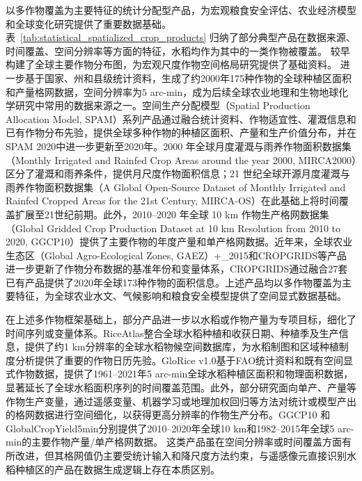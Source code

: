 以多作物覆盖为主要特征的统计分配型产品，为宏观粮食安全评估、农业经济模型和全球变化研究提供了重要数据基础。表~\ref{tab:statistical_spatialized_crop_products} 归纳了部分典型产品在数据来源、时间覆盖、空间分辨率等方面的特征，水稻均作为其中的一类作物被覆盖。\citet{Leff2004} 较早构建了全球主要作物分布图，为宏观尺度作物空间格局研究提供了基础资料。\citet{Monfreda2008CropDistribution} 进一步基于国家、州和县级统计资料，生成了约2000年175种作物的全球种植区面积和产量格网数据，空间分辨率为5 arc-min，成为后续全球农业地理和生物地球化学研究中常用的数据来源之一。空间生产分配模型（Spatial Production Allocation Model, SPAM）系列产品通过融合统计资料、作物适宜性、灌溉信息和已有作物分布先验，提供全球多种作物的种植区面积、产量和生产价值分布，并在SPAM 2020中进一步更新至2020年\cite{You2014SPAM,Yu2020SPAM,IFPRI2026SPAM2020}。2000 年全球月度灌溉与雨养作物面积数据集（Monthly Irrigated and Rainfed Crop Areas around the year 2000, MIRCA2000）区分了灌溉和雨养条件，提供月尺度作物面积信息\cite{Portmann2010MIRCA}；21 世纪全球开源月度灌溉与雨养作物面积数据集（A Global Open-Source Dataset of Monthly Irrigated and Rainfed Cropped Areas for the 21st Century, MIRCA-OS）在此基础上将时间覆盖扩展至21世纪前期\cite{Kebede2025MIRCAOS}。此外，2010--2020 年全球 10 km 作物生产格网数据集（Global Gridded Crop Production Dataset at 10 km Resolution from 2010 to 2020, GGCP10）提供了主要作物的年度产量和单产格网数据\cite{Qin2024GGCP10}。近年来，全球农业生态区（Global Agro-Ecological Zones, GAEZ）+\_2015和CROPGRIDS等产品进一步更新了作物分布数据的基准年份和变量体系，CROPGRIDS通过融合27套已有产品提供了2020年全球173种作物的面积信息\cite{Grogan2022GAEZ,Tang2024CROPGRIDS}。上述产品均以多作物覆盖为主要特征，为全球农业水文、气候影响和粮食安全模型提供了空间显式数据基础。

在上述多作物框架基础上，部分产品进一步以水稻或作物产量为专项目标，细化了时间序列或变量体系。RiceAtlas整合全球水稻种植和收获日期、种植季及生产信息，提供了约1 km分辨率的全球水稻物候空间数据库\cite{Laborte2017SciData}，为水稻制图和区域种植制度分析提供了重要的作物日历先验。GloRice v1.0基于FAO统计资料和既有空间显式作物数据，提供了1961--2021年5 arc-min全球水稻种植区面积和物理面积数据，显著延长了全球水稻面积序列的时间覆盖范围\cite{Xie2025GloRice}。此外，部分研究面向单产、产量等作物生产变量，通过遥感变量、机器学习或地理加权回归等方法对统计或模型产出的格网数据进行空间细化，以获得更高分辨率的作物生产分布。GGCP10 和GlobalCropYield5min分别提供了2010--2020年全球10 km和1982--2015年全球5 arc-min的主要作物产量/单产格网数据\cite{Qin2024GGCP10,Cao2025GlobalCropYield5min}。%
这类产品虽在空间分辨率或时间覆盖方面有所改进，但其格网值仍主要受统计输入和降尺度方法约束，与遥感像元直接识别水稻种植区的产品在数据生成逻辑上存在本质区别。

